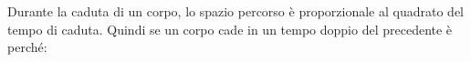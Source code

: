 Durante la caduta di un corpo, lo spazio percorso è
proporzionale al quadrato del tempo di caduta. 
Quindi se un corpo
cade in un tempo doppio del precedente è perché:
